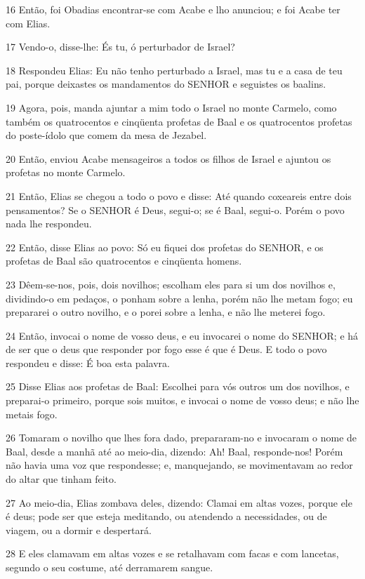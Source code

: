 \par 16 Então, foi Obadias encontrar-se com Acabe e lho anunciou; e foi Acabe ter com Elias.
\par 17 Vendo-o, disse-lhe: És tu, ó perturbador de Israel?
\par 18 Respondeu Elias: Eu não tenho perturbado a Israel, mas tu e a casa de teu pai, porque deixastes os mandamentos do SENHOR e seguistes os baalins.
\par 19 Agora, pois, manda ajuntar a mim todo o Israel no monte Carmelo, como também os quatrocentos e cinqüenta profetas de Baal e os quatrocentos profetas do poste-ídolo que comem da mesa de Jezabel.
\par 20 Então, enviou Acabe mensageiros a todos os filhos de Israel e ajuntou os profetas no monte Carmelo.
\par 21 Então, Elias se chegou a todo o povo e disse: Até quando coxeareis entre dois pensamentos? Se o SENHOR é Deus, segui-o; se é Baal, segui-o. Porém o povo nada lhe respondeu.
\par 22 Então, disse Elias ao povo: Só eu fiquei dos profetas do SENHOR, e os profetas de Baal são quatrocentos e cinqüenta homens.
\par 23 Dêem-se-nos, pois, dois novilhos; escolham eles para si um dos novilhos e, dividindo-o em pedaços, o ponham sobre a lenha, porém não lhe metam fogo; eu prepararei o outro novilho, e o porei sobre a lenha, e não lhe meterei fogo.
\par 24 Então, invocai o nome de vosso deus, e eu invocarei o nome do SENHOR; e há de ser que o deus que responder por fogo esse é que é Deus. E todo o povo respondeu e disse: É boa esta palavra.
\par 25 Disse Elias aos profetas de Baal: Escolhei para vós outros um dos novilhos, e preparai-o primeiro, porque sois muitos, e invocai o nome de vosso deus; e não lhe metais fogo.
\par 26 Tomaram o novilho que lhes fora dado, prepararam-no e invocaram o nome de Baal, desde a manhã até ao meio-dia, dizendo: Ah! Baal, responde-nos! Porém não havia uma voz que respondesse; e, manquejando, se movimentavam ao redor do altar que tinham feito.
\par 27 Ao meio-dia, Elias zombava deles, dizendo: Clamai em altas vozes, porque ele é deus; pode ser que esteja meditando, ou atendendo a necessidades, ou de viagem, ou a dormir e despertará.
\par 28 E eles clamavam em altas vozes e se retalhavam com facas e com lancetas, segundo o seu costume, até derramarem sangue.
